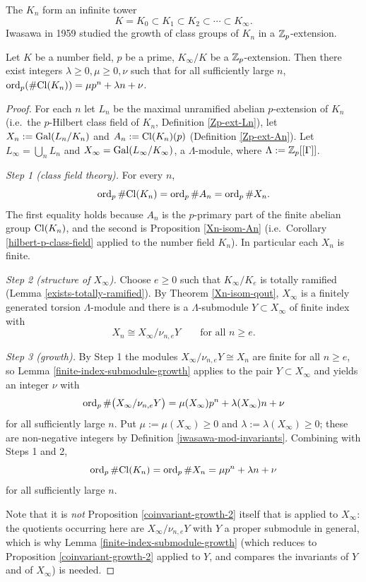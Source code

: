 The $K_n$ form an infinite tower
$$
K=K_0\subset K_1\subset K_2\subset\cdots\subset K_\infty.
$$
Iwasawa in 1959 \cite{Iwa59}
studied the growth of class groups of $K_n$ in a ${\mathbb {Z}}_p$-extension.

\begin{thm}
\label{clgp-growth}
\leanok
Let $K$ be a number field, $p$ be a prime,
$K_\infty/K$ be a ${\mathbb {Z}}_p$-extension.
Then there exist integers $\lambda\geq 0,\mu\geq 0,\nu$
such that for all sufficiently large $n$,
$\operatorname{ord}_p(\#{\mathrm{Cl}}(K_n))=\mu p^n+\lambda n+\nu$.
\end{thm}

\begin{proof}
\leanok
For each $n$ let $L_n$ be the maximal unramified abelian $p$-extension of $K_n$
(i.e.~the $p$-Hilbert class field of $K_n$, Definition \ref{Zp-ext-Ln}), let
$X_n:={\mathrm{Gal}}(L_n/K_n)$ and $A_n:={\mathrm{Cl}}(K_n)(p)$ (Definition \ref{Zp-ext-An}).
Let $L_\infty=\bigcup_nL_n$ and $X_\infty={\mathrm{Gal}}(L_\infty/K_\infty)$, a
$\Lambda$-module, where $\Lambda:={\mathbb {Z}}_p[[\Gamma]]$.

\emph{Step 1 (class field theory).}
For every $n$,
$$\operatorname{ord}_p\#{\mathrm{Cl}}(K_n)=\operatorname{ord}_p\#A_n=\operatorname{ord}_p\#X_n .$$
The first equality holds because $A_n$ is the $p$-primary part of the finite
abelian group ${\mathrm{Cl}}(K_n)$, and the second is
Proposition \ref{Xn-isom-An} (i.e.~Corollary \ref{hilbert-p-class-field}
applied to the number field $K_n$).
In particular each $X_n$ is finite.

\emph{Step 2 (structure of $X_\infty$).}
Choose $e\geq 0$ such that $K_\infty/K_e$ is totally ramified
(Lemma \ref{exists-totally-ramified}).
By Theorem \ref{Xn-isom-qout}, $X_\infty$ is a finitely generated torsion
$\Lambda$-module and there is a $\Lambda$-submodule $Y\subset X_\infty$ of
finite index with
$$X_n\cong X_\infty/\nu_{n,e}Y\qquad\text{for all }n\geq e .$$

\emph{Step 3 (growth).}
By Step 1 the modules $X_\infty/\nu_{n,e}Y\cong X_n$ are finite for all
$n\geq e$, so Lemma \ref{finite-index-submodule-growth} applies to the pair
$Y\subset X_\infty$ and yields an integer $\nu$ with
$$\operatorname{ord}_p\#\big(X_\infty/\nu_{n,e}Y\big)
=\mu(X_\infty)p^n+\lambda(X_\infty)n+\nu$$
for all sufficiently large $n$.
Put $\mu:=\mu(X_\infty)\geq 0$ and $\lambda:=\lambda(X_\infty)\geq 0$; these
are non-negative integers by Definition \ref{iwasawa-mod-invariants}.
Combining with Steps 1 and 2,
$$\operatorname{ord}_p\#{\mathrm{Cl}}(K_n)=\operatorname{ord}_p\#X_n=\mu p^n+\lambda n+\nu$$
for all sufficiently large $n$.

Note that it is \emph{not} Proposition \ref{coinvariant-growth-2} itself that
is applied to $X_\infty$: the quotients occurring here are
$X_\infty/\nu_{n,e}Y$ with $Y$ a proper submodule in general, which is why
Lemma \ref{finite-index-submodule-growth} (which reduces to
Proposition \ref{coinvariant-growth-2} applied to $Y$, and compares the
invariants of $Y$ and of $X_\infty$) is needed.
\end{proof}

